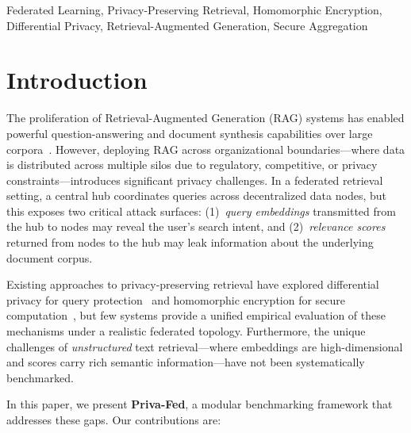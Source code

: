 \documentclass[conference]{IEEEtran}
\begin{document}
\begin{IEEEkeywords}
Federated Learning, Privacy-Preserving Retrieval, Homomorphic Encryption, Differential Privacy, Retrieval-Augmented Generation, Secure Aggregation
\end{IEEEkeywords}

\section{Introduction}
\label{sec:intro}

The proliferation of Retrieval-Augmented Generation (RAG) systems has enabled powerful question-answering and document synthesis capabilities over large corpora~\cite{lewis2020retrieval}. However, deploying RAG across organizational boundaries---where data is distributed across multiple silos due to regulatory, competitive, or privacy constraints---introduces significant privacy challenges. In a federated retrieval setting, a central hub coordinates queries across decentralized data nodes, but this exposes two critical attack surfaces: (1)~\textit{query embeddings} transmitted from the hub to nodes may reveal the user's search intent, and (2)~\textit{relevance scores} returned from nodes to the hub may leak information about the underlying document corpus.

Existing approaches to privacy-preserving retrieval have explored differential privacy for query protection~\cite{dwork2006calibrating} and homomorphic encryption for secure computation~\cite{gentry2009fully}, but few systems provide a unified empirical evaluation of these mechanisms under a realistic federated topology. Furthermore, the unique challenges of \textit{unstructured} text retrieval---where embeddings are high-dimensional and scores carry rich semantic information---have not been systematically benchmarked.

In this paper, we present \textbf{Priva-Fed}, a modular benchmarking framework that addresses these gaps. Our contributions are:
\end{document}
